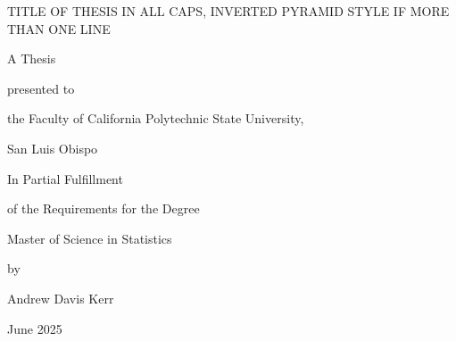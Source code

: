 \begin{center}
\thispagestyle{empty}

TITLE OF THESIS IN ALL CAPS, INVERTED PYRAMID STYLE IF MORE THAN ONE LINE

\vspace{1in}

A Thesis 

presented to 

the Faculty of California Polytechnic State University, 

San Luis Obispo

\vspace{1in}

In Partial Fulfillment 

of the Requirements for the Degree

Master of Science in Statistics 

\vspace{1in}

by

Andrew Davis Kerr

June 2025

\end{center}
\clearpage